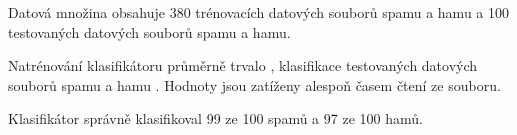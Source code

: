 \documentclass[a4paper, 12pt]{report}
\begin{document}
Datová množina obsahuje 380 trénovacích datových souborů spamu a hamu a 
100 testovaných datových souborů spamu a hamu.

Natrénování klasifikátoru průměrně trvalo , 
klasifikace testovaných datových souborů spamu  a hamu 
. Hodnoty jsou zatíženy alespoň časem čtení ze souboru.

Klasifikátor správně klasifikoval 99 ze 100 spamů a 97 ze 100 hamů.
\end{document}
